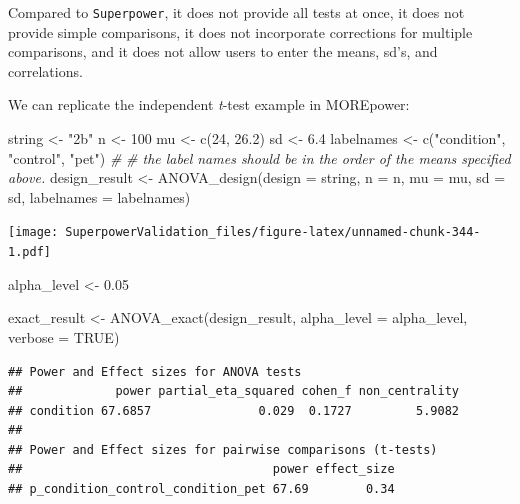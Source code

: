 \documentclass[
]{book}
\newenvironment{Shaded}{\begin{snugshade}}{\end{snugshade}}
\newcommand{\AttributeTok}[1]{\textcolor[rgb]{0.77,0.63,0.00}{#1}}
\newcommand{\CommentTok}[1]{\textcolor[rgb]{0.56,0.35,0.01}{\textit{#1}}}
\newcommand{\ConstantTok}[1]{\textcolor[rgb]{0.00,0.00,0.00}{#1}}
\newcommand{\DecValTok}[1]{\textcolor[rgb]{0.00,0.00,0.81}{#1}}
\newcommand{\FloatTok}[1]{\textcolor[rgb]{0.00,0.00,0.81}{#1}}
\newcommand{\FunctionTok}[1]{\textcolor[rgb]{0.00,0.00,0.00}{#1}}
\newcommand{\NormalTok}[1]{#1}
\newcommand{\OtherTok}[1]{\textcolor[rgb]{0.56,0.35,0.01}{#1}}
\newcommand{\StringTok}[1]{\textcolor[rgb]{0.31,0.60,0.02}{#1}}
\begin{document}
Compared to \texttt{Superpower}, it does not provide all tests at once, it does not provide simple comparisons, it does not incorporate corrections for multiple comparisons, and it does not allow users to enter the means, sd's, and correlations.

We can replicate the independent \emph{t}-test example in MOREpower:

\begin{Shaded}
\begin{Highlighting}[]
\NormalTok{string }\OtherTok{\textless{}{-}} \StringTok{"2b"}
\NormalTok{n }\OtherTok{\textless{}{-}} \DecValTok{100}
\NormalTok{mu }\OtherTok{\textless{}{-}} \FunctionTok{c}\NormalTok{(}\DecValTok{24}\NormalTok{, }\FloatTok{26.2}\NormalTok{)}
\NormalTok{sd }\OtherTok{\textless{}{-}} \FloatTok{6.4}
\NormalTok{labelnames }\OtherTok{\textless{}{-}} \FunctionTok{c}\NormalTok{(}\StringTok{"condition"}\NormalTok{, }\StringTok{"control"}\NormalTok{, }\StringTok{"pet"}\NormalTok{) }\CommentTok{\#}
\CommentTok{\# the label names should be in the order of the means specified above.}
\NormalTok{design\_result }\OtherTok{\textless{}{-}} \FunctionTok{ANOVA\_design}\NormalTok{(}\AttributeTok{design =}\NormalTok{ string,}
                              \AttributeTok{n =}\NormalTok{ n,}
                              \AttributeTok{mu =}\NormalTok{ mu,}
                              \AttributeTok{sd =}\NormalTok{ sd,}
                              \AttributeTok{labelnames =}\NormalTok{ labelnames)}
\end{Highlighting}
\end{Shaded}

\texttt{[image: SuperpowerValidation\_files/figure-latex/unnamed-chunk-344-1.pdf]}

\begin{Shaded}
\begin{Highlighting}[]
\NormalTok{alpha\_level }\OtherTok{\textless{}{-}} \FloatTok{0.05}

\NormalTok{exact\_result }\OtherTok{\textless{}{-}} \FunctionTok{ANOVA\_exact}\NormalTok{(design\_result,}
                            \AttributeTok{alpha\_level =}\NormalTok{ alpha\_level,}
                            \AttributeTok{verbose =} \ConstantTok{TRUE}\NormalTok{)}
\end{Highlighting}
\end{Shaded}

\begin{verbatim}
## Power and Effect sizes for ANOVA tests
##             power partial_eta_squared cohen_f non_centrality
## condition 67.6857               0.029  0.1727         5.9082
## 
## Power and Effect sizes for pairwise comparisons (t-tests)
##                                   power effect_size
## p_condition_control_condition_pet 67.69        0.34
\end{verbatim}
\end{document}
